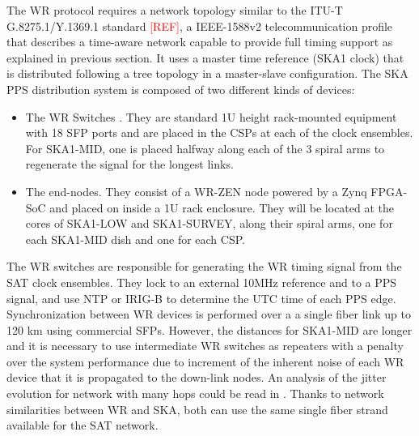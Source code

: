 %
%

The WR protocol requires a network topology similar to the ITU-T G.8275.1/Y.1369.1 standard \textcolor{red}{[REF]}, a IEEE-1588v2 telecommunication profile that describes a time-aware network capable to provide full timing support \cite{itu:TG8275_1_Y_1369_1} as explained in previous section. It uses a master time reference (SKA1 clock) that is distributed following a tree topology in a master-slave configuration. The SKA PPS distribution system is composed of two different kinds of devices: 

\begin{itemize}
	\item {The WR Switches \cite{sevensols:wr_switch}. They are standard 1U height rack-mounted equipment with 18 SFP ports and are placed in the CSPs at each of the clock ensembles. For SKA1-MID, one is placed halfway along each of the 3 spiral arms to regenerate the signal for the longest links.}
	\item{The end-nodes. They consist of a WR-ZEN node \cite{sevensols:wr_zen} powered by a Zynq FPGA-SoC and placed on inside a 1U rack enclosure. They will be located at the cores of SKA1-LOW and SKA1-SURVEY, along their spiral arms, one for each SKA1-MID dish and one for each CSP.}
\end{itemize}

The WR switches are responsible for generating the WR timing signal from the SAT clock ensembles. They lock to an external 10MHz reference and to a PPS signal, and use NTP or IRIG-B to determine the UTC time of each PPS edge. Synchronization between WR devices is performed over a a single fiber link up to 120 km using commercial SFPs.
However, the distances for SKA1-MID are longer and it is necessary to use 
intermediate WR switches as repeaters with a penalty over the system 
performance due to increment of the inherent noise of each WR device that it is 
propagated to the down-link nodes. An analysis of the jitter evolution for 
network with many hops could be read in \cite{torres2016scalability}. Thanks to 
network similarities between WR and SKA, both can use the same single fiber 
strand available for the SAT network. 

